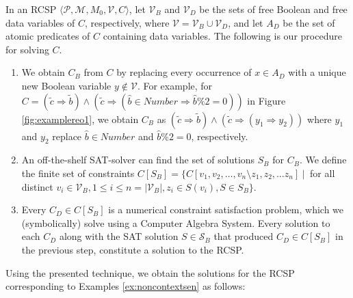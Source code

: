 In an RCSP $\langle \mathcal{P}, \mathcal{M}, M_0, \mathcal{V}, C \rangle$, let $\mathcal{V}_B$ and $\mathcal{V}_D$ be the sets of free Boolean and free data variables of $C$, respectively, where $\mathcal{V} = \mathcal{V}_B \cup \mathcal{V}_D$, and  let $A_D$ be the set of atomic predicates of $C$ containing data variables. The following is our procedure for solving $C$.
\begin{enumerate}
\item We obtain $C_B$ from $C$ by replacing every occurrence of $x \in A_D$ with a unique new Boolean variable $y \notin \mathcal{V}$. For example, for $C=(\tilde{c} \Rightarrow  \tilde{b}) \wedge (\tilde{c} \Rightarrow (\hat{b} \in Number \Rightarrow \hat{b} \% 2=0))$ in Figure \ref{fig:examplereo1}, we obtain $C_B$ as $(\tilde{c} \Rightarrow  \tilde{b}) \wedge (\tilde{c} \Rightarrow (y_1 \Rightarrow y_2))$  where $y_1$ and $y_2$ replace $\hat{b} \in Number$ and $\hat{b} \% 2=0$, respectively.
\item An off-the-shelf SAT-solver can find the set of solutions $S_B$ for $C_B$. We define the finite set of constraints $C\left[S_B\right]=\{C\left[v_1, v_2, \dots, v_n \setminus z_1, z_2, \dots z_n\right]~|~ $ for all distinct $v_i \in \mathcal{V}_B, 1 \leq i \leq n = |\mathcal{V}_B|, z_i \in S \left( v_i \right), S \in S_B \}$. 
\item Every $C_D \in C\left[S_B\right]$ is a numerical constraint satisfaction problem, which we (symbolically) solve using a Computer Algebra System. Every solution to each $C_D$ along with the SAT solution $S \in \mathcal{S}_B$ that produced $C_D \in C\left[S_B\right]$ in the previous step, constitute a solution to the RCSP. 
\end{enumerate}

Using the presented technique, we obtain the solutions for the RCSP corresponding to Examples \ref{ex:noncontextsen} as follows: 

